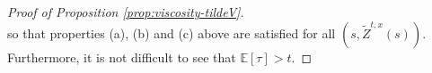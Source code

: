 \documentclass[11pt]{article}
\theoremstyle{definition}
\theoremstyle{plain}
\newcommand{\E}{\mathbb{E}}
\begin{document}
\begin{proof}[Proof of Proposition \ref{prop:viscosity-tildeV}]
\[\]
so that properties (a), (b) and (c) above are satisfied for all $(s, \tilde Z^{t,x}(s))$.
Furthermore, it is not difficult to see that $\E[\tau] > t$. 


\end{proof}
\end{document}
